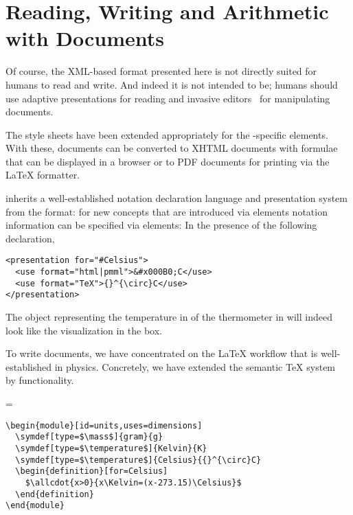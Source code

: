 \section{Reading, Writing and Arithmetic with {\physml} Documents}\label{sec:physml-stex}

Of course, the XML-based {\physml} format presented here is not directly suited for humans
to read and write. And indeed it is not intended to be; humans should use adaptive
presentations for reading and invasive editors~\cite{KohKoh:cdad04} for manipulating
{\physml} documents.

The {\omdoc} style sheets have been extended appropriately for the {\physml}-specific
elements. With these, {\physml} documents can be converted to XHTML documents with
{\mathml} formulae that can be displayed in a browser or to PDF documents for printing via
the {\LaTeX} formatter.

{\physml} inherits a well-established notation declaration language and presentation
system from the {\omdoc} format: for new concepts that are introduced via
{} elements notation information can be specified via {\omdoc}
{} elements: In the presence of the following declaration,
\begin{lstlisting}
<presentation for="#Celsius">
  <use format="html|pmml">&#x000B0;C</use>
  <use format="TeX">{}^{\circ}C</use>
</presentation>
\end{lstlisting}
The {\openmath} object representing the temperature in of the thermometer in
{} will indeed look like the visualization in the box. 

To write {\physml} documents, we have concentrated on the {\LaTeX} workflow that is
well-established in physics. Concretely, we have extended the semantic {\TeX} system
{\stex}~\cite{Kohlhase:albwo06} by {\physml} functionality. 

=\hbox{\footnotesize\stex}
\begin{lstlisting}[label=lst:units-stex,caption=Writing the {\physml} for
  {\mylstref{units}} in \usebox0] 
\begin{module}[id=units,uses=dimensions]
  \symdef[type=$\mass$]{gram}{g}
  \symdef[type=$\temperature$]{Kelvin}{K}
  \symdef[type=$\temperature$]{Celsius}{{}^{\circ}C}
  \begin{definition}[for=Celsius]
    $\allcdot{x>0}{x\Kelvin=(x-273.15)\Celsius}$
  \end{definition}
\end{module}
\end{lstlisting}

